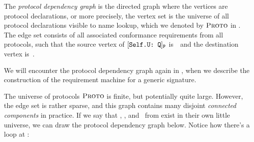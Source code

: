 \documentclass[../generics]{subfiles}
\begin{document}
\begin{definition}\label{protocol dependency graph def}
The \emph{protocol dependency graph} is the directed graph where the vertices are protocol declarations, or more precisely, the vertex set is the universe of all protocol declarations visible to name lookup, which we denoted by $\textsc{Proto}$ in . The edge set consists of all associated conformance requirements from all protocols, such that the source vertex of $[\texttt{Self.U:~Q}]_{\texttt{P}}$ is~\tP\ and the destination vertex is~\tQ.
\end{definition}

We will encounter the protocol dependency graph again in , when we describe the construction of the requirement machine for a generic signature.

\begin{example}
The universe of protocols $\textsc{Proto}$ is finite, but potentially quite large. However, the edge set is rather sparse, and this graph contains many disjoint \emph{connected components} in practice. If we say that \tCollection, \tSequence, and \tIterator\ from  exist in their own little universe, we can draw the protocol dependency graph below. Notice how there's a loop at \tCollection:
\begin{center}
\end{center}
\end{example}
\end{document}
